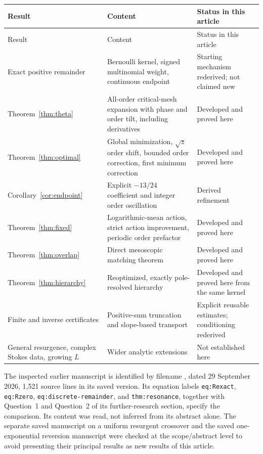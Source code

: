 \documentclass[11pt,a4paper]{article}
\numberwithin{equation}{section}
\theoremstyle{definition}\newtheorem{definition}[theorem]{Definition}
\theoremstyle{remark}\newtheorem{remark}[theorem]{Remark}
\begin{document}
\begin{longtable}{@{}>{\raggedright\arraybackslash}p{}>{\raggedright\arraybackslash}p{}>{\raggedright\arraybackslash}p{}@{}}
\toprule
Result & Content & Status in this article\\\midrule
\endfirsthead
\toprule Result & Content & Status in this article\\\midrule\endhead
Exact positive remainder & Bernoulli kernel, signed multinomial weight,
continuous endpoint & Starting mechanism rederived; not claimed new\\[4pt]
Theorem~\ref{thm:theta} & All-order critical-mesh expansion with phase and
order tilt, including derivatives & Developed and proved here\\[4pt]
Theorem~\ref{thm:optimal} & Global minimization, $\sqrt z$ order shift,
bounded order correction, first minimum correction & Developed and proved here\\[4pt]
Corollary~\ref{cor:endpoint} & Explicit $-13/24$ coefficient and integer
order oscillation & Derived refinement\\[4pt]
Theorem~\ref{thm:fixed} & Logarithmic-mean action, strict action improvement,
periodic order prefactor & Developed and proved here\\[4pt]
Theorem~\ref{thm:overlap} & Direct mesoscopic matching theorem & Developed
and proved here\\[4pt]
Theorem~\ref{thm:hierarchy} & Reoptimized, exactly pole-resolved hierarchy &
Developed and proved here from the same kernel\\[4pt]
Finite and inverse certificates & Positive-sum truncation and slope-based
transport & Explicit reusable estimates; conditioning rederived\\[4pt]
General resurgence, complex Stokes data, growing $L$ & Wider analytic
extensions & Not established here\\
\bottomrule
\end{longtable}

The inspected earlier manuscript is identified by filename
, dated 29 September 2026,
1,521 source lines in its saved version. Its equation labels
\texttt{eq:Rexact}, \texttt{eq:Rzero}, \texttt{eq:discrete-remainder}, and
\texttt{thm:resonance}, together with Question~1 and Question~2 of its
further-research section, specify the comparison. Its content was read,
not inferred from its abstract alone. The separate saved manuscript on a
uniform resurgent crossover and the saved one-exponential reversion
manuscript were checked at the scope/abstract level to avoid presenting
their principal results as new results of this article.
\end{document}
